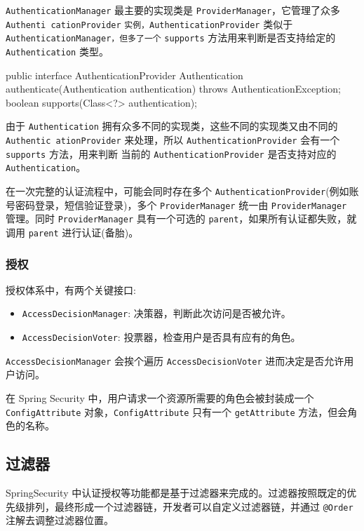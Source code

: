 \texttt{AuthenticationManager} 最主要的实现类是 \texttt{ProviderManager}，它管理了众多 \texttt{Authenti cationProvider} \texttt{实例，AuthenticationProvider} 类似于 \texttt{AuthenticationManager，但多了一个} \texttt{supports} 方法用来判断是否支持给定的 \texttt{Authentication} 类型。

\begin{Java}
public interface AuthenticationProvider {
    Authentication authenticate(Authentication authentication) throws AuthenticationException;
    boolean supports(Class<?> authentication);
}
\end{Java}

由于 \texttt{Authentication} 拥有众多不同的实现类，这些不同的实现类又由不同的 \texttt{Authentic ationProvider} 来处理，所以 \texttt{AuthenticationProvider} 会有一个 \texttt{supports} 方法，用来判断
当前的 \texttt{AuthenticationProvider} 是否支持对应的\texttt{Authentication}。

在一次完整的认证流程中，可能会同时存在多个 \texttt{AuthenticationProvider}(例如账号密码登录，短信验证登录)，多个 \texttt{ProviderManager} 统一由 \texttt{ProviderManager} 管理。同时 \texttt{ProviderManager} 具有一个可选的 \texttt{parent}，如果所有认证都失败，就调用 \texttt{parent} 进行认证(备胎)。

\subsubsection*{授权}

授权体系中，有两个关键接口:
\begin{itemize}
  \item \texttt{AccessDecisionManager}: 决策器，判断此次访问是否被允许。
  \item \texttt{AccessDecisionVoter}: 投票器，检查用户是否具有应有的角色。
\end{itemize}

\texttt{AccessDecisionManager} 会挨个遍历 \texttt{AccessDecisionVoter} 进而决定是否允许用户访问。

在 Spring Security 中，用户请求一个资源所需要的角色会被封装成一个 \texttt{ConfigAttribute} 对象，\texttt{ConfigAttribute} 只有一个 \texttt{getAttribute} 方法，但会角色的名称。

\subsection{过滤器}

SpringSecurity 中认证授权等功能都是基于过滤器来完成的。过滤器按照既定的优先级排列，最终形成一个过滤器链，开发者可以自定义过滤器链，并通过 \texttt{@Order} 注解去调整过滤器位置。

